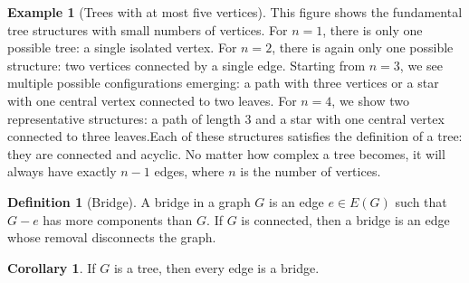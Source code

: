 \documentclass{article}
\theoremstyle{definition}
\newtheorem{example}{Example}
\newtheorem{corollary}{Corollary}
\newtheorem{definition}{Definition}
\begin{document}
\begin{example}[Trees with at most five vertices]
This figure shows the fundamental tree structures with small numbers of vertices. For $n=1$, there is only one possible tree: a single isolated vertex. For $n=2$, there is again only one possible structure: two vertices connected by a single edge. Starting from $n=3$, we see multiple possible configurations emerging: a path with three vertices or a star with one central vertex connected to two leaves. For $n=4$, we show two representative structures: a path of length 3 and a star with one central vertex connected to three leaves.Each of these structures satisfies the definition of a tree: they are connected and acyclic. No matter how complex a tree becomes, it will always have exactly $n-1$ edges, where $n$ is the number of vertices.
\end{example}
\begin{definition} [Bridge]
A bridge in a graph $G$ is an edge $e \in E(G)$ such that $G - e$ has more components than $G$.
If $G$ is connected, then a bridge is an edge whose removal disconnects the graph.
\end{definition}

\begin{corollary}
If $G$ is a tree, then every edge is a bridge.
\end{corollary}
\end{document}
